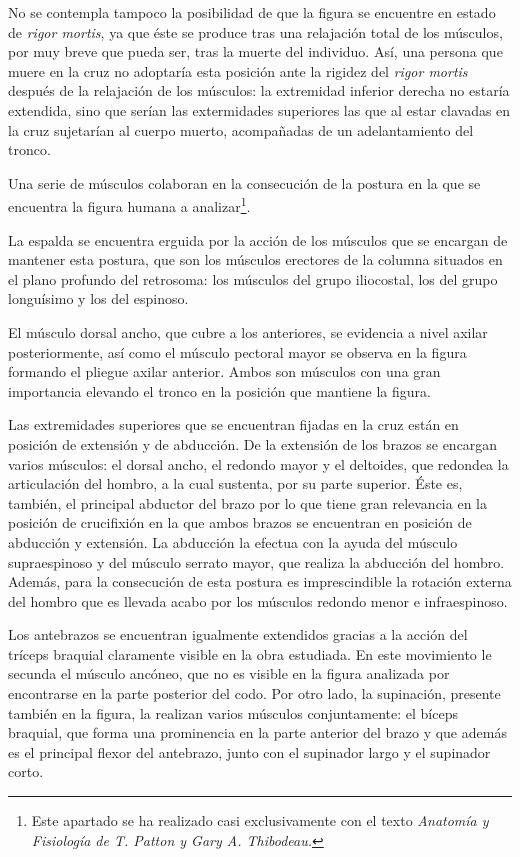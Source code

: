 No se contempla tampoco la posibilidad de que la figura se encuentre en estado de \textit{rigor mortis}, ya que éste se produce tras una relajación total de los músculos, por muy breve que pueda ser, tras la muerte del individuo. Así, una persona que muere en la cruz no adoptaría esta posición ante la rigidez del \textit{rigor mortis} después de la relajación de los músculos: la extremidad inferior derecha no estaría extendida, sino que serían las extermidades superiores las que al estar clavadas en la cruz sujetarían al cuerpo muerto, acompañadas de un adelantamiento del tronco. %

Una serie de músculos colaboran en la consecución de la postura en la que se encuentra la figura humana a analizar\footnote{Este apartado se ha realizado casi exclusivamente con el texto \textit{Anatomía y Fisiología de T. Patton y Gary A. Thibodeau.}\cite{RefWorks:63}}.

La espalda se encuentra erguida por la acción de los músculos que se encargan de mantener esta postura, que son los músculos erectores de la columna situados en el plano profundo del retrosoma: los músculos del grupo iliocostal, los del grupo longuísimo y los del espinoso.

El músculo dorsal ancho, que cubre a los anteriores, se evidencia a nivel axilar posteriormente, así como el músculo pectoral mayor se observa en la figura formando el pliegue axilar anterior. Ambos son músculos con una gran importancia elevando el tronco en la posición que mantiene la figura.

Las extremidades superiores que se encuentran fijadas en la cruz están en posición de extensión y de abducción. De la extensión de los brazos se encargan varios músculos: el dorsal ancho, el redondo mayor y el deltoides, que redondea la articulación del hombro, a la cual sustenta, por su parte superior. Éste es, también, el principal abductor del brazo por lo que tiene gran relevancia en la posición de crucifixión en la que ambos brazos se encuentran en posición de abducción y extensión. La abducción la efectua con la ayuda del músculo supraespinoso y del músculo serrato mayor, que realiza la abducción del hombro. Además, para la consecución de esta postura es imprescindible la rotación externa del hombro que es llevada acabo por los músculos redondo menor e infraespinoso.

Los antebrazos se encuentran igualmente extendidos gracias a la acción del tríceps braquial claramente visible en la obra estudiada. En este movimiento le secunda el músculo ancóneo, que no es visible en la figura analizada por encontrarse en la parte posterior del codo. Por otro lado, la supinación, presente también en la figura, la realizan varios músculos conjuntamente: el bíceps braquial, que forma una prominencia en la parte anterior del brazo y que además es el principal flexor del antebrazo, junto con el supinador largo y el supinador corto.


